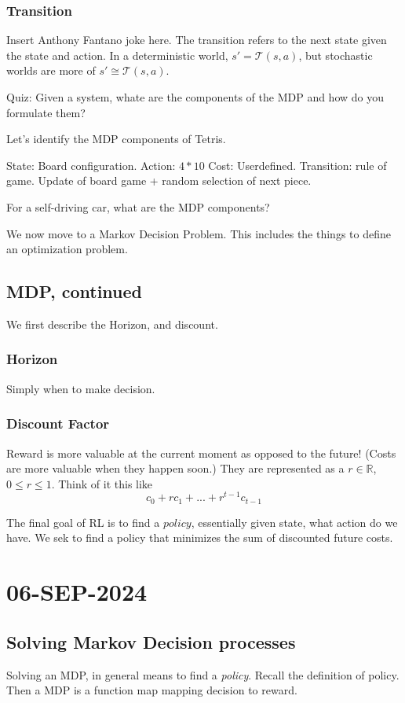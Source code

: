 \documentclass[10pt, oneside]{article}
\theoremstyle{definition}
\begin{document}
\subsubsection{Transition}
Insert Anthony Fantano joke here. The transition refers to the next state given the state and action. In a deterministic world, $s' = \mathcal{T}(s,a)$, but stochastic worlds are more of $s' \cong \mathcal{T}(s,a)$.

Quiz: Given a system, whate are the components of the MDP and how do you formulate them?

Let's identify the MDP components of Tetris.

State: Board configuration. 
Action: $4 * 10$
Cost: Userdefined. 
Transition: rule of game. Update of board game + random selection of next piece. 


For a self-driving car, what are the MDP components?

We now move to a Markov Decision Problem. This includes the things to define an optimization problem.
\subsection{MDP, continued}
We first describe the Horizon, and discount. 
\subsubsection{Horizon}
Simply when to make decision.
\subsubsection{Discount Factor}
Reward is more valuable at the current moment as opposed to the future! (Costs are more valuable when they happen soon.) They are represented as a $r \in \mathbb{R}$, $0 \leq r \leq 1$. Think of it this like 
\[c_0 + rc_1 + ... + r^{t-1}c_{t-1}\]

The final goal of RL is to find a $\textit{policy}$, essentially given state, what action do we have. We sek to find a policy that minimizes the sum of discounted future costs. 

\section{06-SEP-2024}
\subsection{Solving Markov Decision processes}
Solving an MDP, in general means to find a \textit{policy}. Recall the definition of policy. Then a MDP is a function map mapping decision to reward.  
\end{document}
